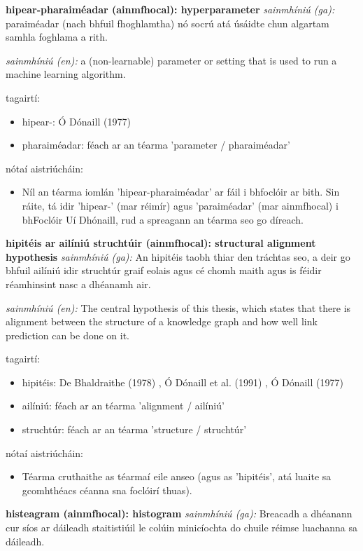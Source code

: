 \documentclass{article}
\begin{document}
\textbf{hipear-pharaiméadar (ainmfhocal): hyperparameter}
\textit{sainmhíniú (ga):} paraiméadar (nach bhfuil fhoghlamtha) nó socrú atá úsáidte chun algartam samhla foghlama a rith.

\textit{sainmhíniú (en):} a (non-learnable) parameter or setting that is used to run a machine learning algorithm.

tagairtí:
\begin{itemize}
	\item hipear-: Ó Dónaill (1977) \cite{odonaill}
	\item pharaiméadar: féach ar an téarma 'parameter / pharaiméadar'
\end{itemize}

nótaí aistriúcháin:
\begin{itemize}
	\item Níl an téarma iomlán 'hipear-pharaiméadar' ar fáil i bhfoclóir ar bith. Sin ráite, tá idir 'hipear-' (mar réimír) agus 'paraiméadar' (mar ainmfhocal) i bhFoclóir Uí Dhónaill, rud a spreagann an téarma seo go díreach.
\end{itemize}


\textbf{hipitéis ar ailíniú struchtúir (ainmfhocal): structural alignment hypothesis}
\textit{sainmhíniú (ga):} An hipitéis taobh thiar den tráchtas seo, a deir go bhfuil ailíniú idir struchtúr graif eolais agus cé chomh maith agus is féidir réamhinsint nasc a dhéanamh air.

\textit{sainmhíniú (en):} The central hypothesis of this thesis, which states that there is alignment between the structure of a knowledge graph and how well link prediction can be done on it.

tagairtí:
\begin{itemize}
	\item hipitéis: De Bhaldraithe (1978) \cite{de-bhaldraithe}, Ó Dónaill et al. (1991) \cite{focloir-beag}, Ó Dónaill (1977) \cite{odonaill}
	\item ailíniú: féach ar an téarma 'alignment / ailíniú'
	\item struchtúr: féach ar an téarma 'structure / struchtúr'
\end{itemize}

nótaí aistriúcháin:
\begin{itemize}
	\item Téarma cruthaithe as téarmaí eile anseo (agus as 'hipitéis', atá luaite sa gcomhthéacs céanna sna foclóirí thuas).
\end{itemize}


\textbf{histeagram (ainmfhocal): histogram}
\textit{sainmhíniú (ga):} Breacadh a dhéanann cur síos ar dáileadh staitistiúil le colúin minicíochta do chuile réimse luachanna sa dáileadh.
\end{document}
